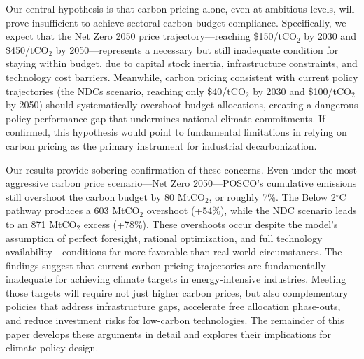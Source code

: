 Our central hypothesis is that carbon pricing alone, even at ambitious levels, will prove insufficient to achieve sectoral carbon budget compliance. Specifically, we expect that the Net Zero 2050 price trajectory—reaching \$150/tCO$_2$ by 2030 and \$450/tCO$_2$ by 2050—represents a necessary but still inadequate condition for staying within budget, due to capital stock inertia, infrastructure constraints, and technology cost barriers. Meanwhile, carbon pricing consistent with current policy trajectories (the NDCs scenario, reaching only \$40/tCO$_2$ by 2030 and \$100/tCO$_2$ by 2050) should systematically overshoot budget allocations, creating a dangerous policy-performance gap that undermines national climate commitments. If confirmed, this hypothesis would point to fundamental limitations in relying on carbon pricing as the primary instrument for industrial decarbonization.

Our results provide sobering confirmation of these concerns. Even under the most aggressive carbon price scenario—Net Zero 2050—POSCO's cumulative emissions still overshoot the carbon budget by 80 MtCO$_2$, or roughly 7\%. The Below 2$^\circ$C pathway produces a 603 MtCO$_2$ overshoot (+54\%), while the NDC scenario leads to an 871 MtCO$_2$ excess (+78\%). These overshoots occur despite the model's assumption of perfect foresight, rational optimization, and full technology availability—conditions far more favorable than real-world circumstances. The findings suggest that current carbon pricing trajectories are fundamentally inadequate for achieving climate targets in energy-intensive industries. Meeting those targets will require not just higher carbon prices, but also complementary policies that address infrastructure gaps, accelerate free allocation phase-outs, and reduce investment risks for low-carbon technologies. The remainder of this paper develops these arguments in detail and explores their implications for climate policy design.

